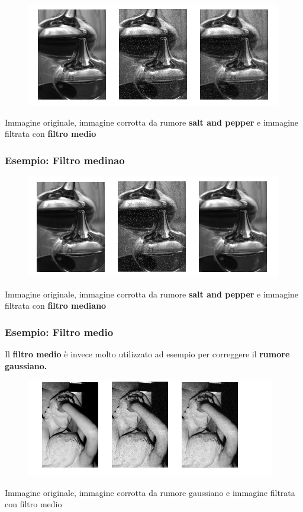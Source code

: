 \begin{figure}[H]
    \centering
    \includegraphics[width=\linewidth, keepaspectratio]{capitoli/immagini/imgs/esempio-filtro-medio.png}
\end{figure}
Immagine originale, immagine corrotta da rumore \textbf{salt and pepper} e
immagine filtrata con \textbf{filtro medio}

\subsubsection{Esempio: Filtro medinao}
\begin{figure}[H]
    \centering
    \includegraphics[width=\linewidth, keepaspectratio]{capitoli/immagini/imgs/esempio-filtro-mediano.png}
\end{figure}
Immagine originale, immagine corrotta da rumore \textbf{salt and pepper} e
immagine filtrata con \textbf{filtro mediano}

\subsubsection{Esempio: Filtro medio}
Il \textbf{filtro medio} è invece molto utilizzato ad esempio per correggere il
\textbf{rumore gaussiano.}
\begin{figure}[H]
    \centering
    \includegraphics[width=\linewidth, keepaspectratio]{capitoli/immagini/imgs/filtro-medio-esempio2.png}
\end{figure}
Immagine originale, immagine corrotta da rumore gaussiano e immagine filtrata con filtro medio

